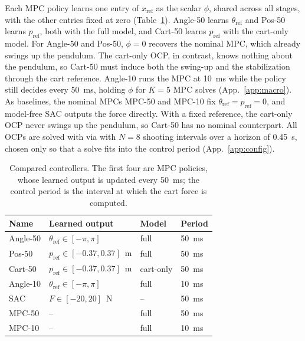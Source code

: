 \documentclass{l4dc2027}
\newcommand{\zopangle}{Angle-50\xspace}
\newcommand{\zoppos}{Pos-50\xspace}
\newcommand{\zopcart}{Cart-50\xspace}
\newcommand{\zopangleten}{Angle-10\xspace}
\newcommand{\mpcfifty}{MPC-50\xspace}
\newcommand{\mpcten}{MPC-10\xspace}
\begin{document}
Each \ac{MPC} policy learns one entry of $x_{\mathrm{ref}}$ as the scalar $\phi$,
shared across all stages, with the other entries fixed at zero
(Table~\ref{tab:methods}). \zopangle learns $\theta_{\mathrm{ref}}$ and \zoppos
learns $p_{\mathrm{ref}}$, both with the full model, and \zopcart learns
$p_{\mathrm{ref}}$ with the cart-only model. For \zopangle and \zoppos,
$\phi=0$ recovers the nominal \ac{MPC}, which already swings up the pendulum.
The cart-only \ac{OCP}, in contrast, knows nothing about the pendulum, so
\zopcart must induce both the swing-up and the stabilization through the cart
reference. \zopangleten runs the \ac{MPC} at 10~ms while the policy still
decides every 50~ms, holding $\phi$ for $K=5$ \ac{MPC} solves
(App.~\ref{app:macro}). As baselines, the nominal \acp{MPC} \mpcfifty and
\mpcten fix $\theta_{\mathrm{ref}}=p_{\mathrm{ref}}=0$, and model-free \ac{SAC}
outputs the force directly. With a fixed reference, the cart-only \ac{OCP}
never swings up the pendulum, so \zopcart has no nominal counterpart. All
\acp{OCP} are solved with \acados via \leapc with $N=8$ shooting intervals over a
horizon of 0.45~s, chosen only so that a solve fits into the control period
(App.~\ref{app:config}).

\begin{table}[t]
  \centering
  \caption{Compared controllers. The first four are \ac{MPC} policies, whose
  learned output is updated every 50~ms; the control period is the interval at
  which the cart force is computed.}
  \label{tab:methods}
  \footnotesize
  \setlength{\tabcolsep}{4pt}
  \begin{tabular}{@{}llll@{}}
    \toprule
    Name         & Learned output                                    & Model     & Period\\
    \midrule
    \zopangle    & $\theta_{\mathrm{ref}}\in[-\pi,\pi]$              & full      & 50~ms\\
    \zoppos      & $p_{\mathrm{ref}}\in[-0.37,0.37]$~m               & full      & 50~ms\\
    \zopcart     & $p_{\mathrm{ref}}\in[-0.37,0.37]$~m               & cart-only & 50~ms\\
    \zopangleten & $\theta_{\mathrm{ref}}\in[-\pi,\pi]$              & full      & 10~ms\\
    SAC          & $F\in[-20,20]$~N                                  & --        & 50~ms\\
    \mpcfifty    & --                                                & full      & 50~ms\\
    \mpcten      & --                                                & full      & 10~ms\\
    \bottomrule
  \end{tabular}
\end{table}
\end{document}
